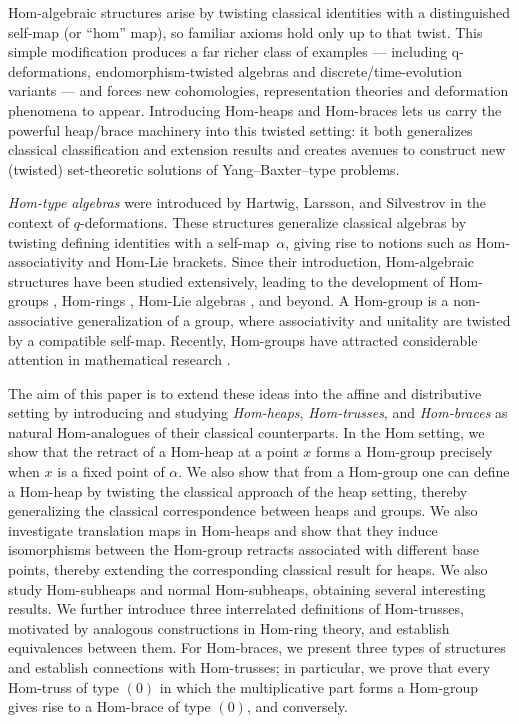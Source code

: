 \documentclass[14pt]{article}
\theoremstyle{Definition}
\theoremstyle{remark}
\begin{document}
Hom-algebraic structures arise by twisting classical identities with a distinguished self-map (or “hom” map), so familiar axioms hold only up to that twist. This simple modification produces a far richer class of examples — including q-deformations, endomorphism-twisted algebras and discrete/time-evolution variants — and forces new cohomologies, representation theories and deformation phenomena to appear. Introducing Hom-heaps and Hom-braces lets us carry the powerful heap/brace machinery into this twisted setting: it both generalizes classical classification and extension results and creates avenues to construct new (twisted) set-theoretic solutions of Yang–Baxter–type problems.

\emph{Hom-type algebras} were introduced by Hartwig, Larsson, and Silvestrov \cite{Har} in the context of $q$-deformations. These structures 
generalize classical algebras by twisting defining identities with a self-map~$\alpha$, 
giving rise to notions such as Hom-associativity and Hom-Lie brackets. Since their 
introduction, Hom-algebraic structures have been studied extensively, leading to the 
development of Hom-groups \cite{Has, Lau}, Hom-rings \cite{Ime}, Hom-Lie algebras \cite{Jia,Lau, Ma, Makh, Fre}, and beyond. A Hom-group is a non-associative generalization of a group, where associativity and unitality are twisted by a compatible self-map. Recently, Hom-groups have attracted considerable attention in mathematical research \cite{Has, Hass, Che}.


The aim of this paper is to extend these ideas into the affine and distributive setting 
by introducing and studying \emph{Hom-heaps}, \emph{Hom-trusses}, and \emph{Hom-braces} 
as natural Hom-analogues of their classical counterparts. In the Hom setting, we show 
that the retract of a Hom-heap at a point $x$ forms a Hom-group precisely when $x$ is a 
fixed point of $\alpha$. We also show that from a Hom-group one can define a Hom-heap by twisting the classical approach of the heap setting, thereby generalizing the classical correspondence between heaps and groups. We also investigate translation maps in Hom-heaps and show that they induce isomorphisms between the Hom-group retracts associated with different base points, thereby extending the corresponding classical result for heaps. We also study Hom-subheaps and normal Hom-subheaps, obtaining several interesting results. We further introduce three interrelated definitions of Hom-trusses, motivated by analogous constructions in Hom-ring theory, and establish equivalences between them. For Hom-braces, we present three types of structures and establish connections with Hom-trusses; in 
particular, we prove that every Hom-truss of type $(0)$ in which the multiplicative part 
forms a Hom-group gives rise to a Hom-brace of type $(0)$, and conversely.
\end{document}
